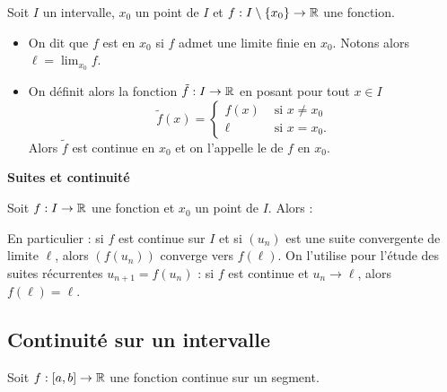 \documentclass[10pt,class=article,crop=false]{standalone}
\begin{document}
\begin{multicols}{2}
Soit $I$ un intervalle, $x_0$ un point de $I$ et $f:I\setminus\{x_0\}\to\mathbb{R}$ une fonction.
\begin{itemize}
\item  On dit que $f$ est 
en $x_0$ si $f$ admet une
limite finie en $x_0$. Notons alors $\ell=\displaystyle\lim_{x_0} f$.
\item On définit alors la fonction $\tilde f:I\to\mathbb{R}$ en posant pour tout $x\in I$
\[
\tilde f(x) =
\begin{cases}
	f(x) &\text{ si } x\neq x_0\\
	\ell &\text{ si } x=x_0.
\end{cases}
\]
Alors $\tilde f$ est continue en $x_0$ et on l'appelle le  de $f$ en $x_0$.
\end{itemize}







\textbf{Suites et continuité}

\begin{proposition}
Soit $f:I\to\mathbb{R}$ une fonction et $x_0$ un point de $I$. Alors :
\end{proposition}

En particulier : si $f$ est continue sur $I$ et si $(u_n)$ est
une suite convergente de limite $\ell$, alors $(f(u_n))$ converge vers $f(\ell)$.
On l'utilise pour l'étude des suites récurrentes $u_{n+1}= f(u_n)$ : si $f$ est
continue et $u_n\to \ell$, alors $f(\ell)=\ell$.




	
\subsection{Continuité sur un intervalle}
	
	
\begin{theoreme}
	Soit $f:[a,b]\to\mathbb{R}$ une fonction continue sur un segment.
\end{theoreme}



\end{multicols}
\end{document}
